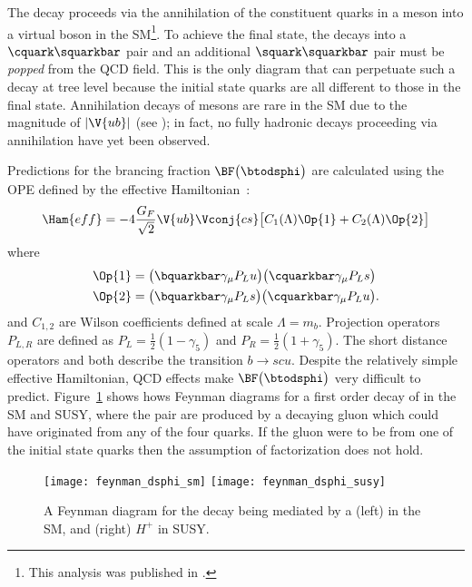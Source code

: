 The decay \btodsphi proceeds via the annihilation of the constituent quarks in a \Bp meson into
a virtual \Wp boson in the SM\footnote{
  This analysis was published in .}.
To achieve the final state, the \Wp decays into a $\cquark\squarkbar$ pair and an additional
$\squark\squarkbar$ pair must be \emph{popped} from the QCD field.
This is the only diagram that can perpetuate such a decay at tree level because the initial state
quarks are all different to those in the final state.
Annihilation decays of \Bp mesons are rare in the SM due to the magnitude of $|\V{ub}|$ (see
); in fact, no fully hadronic decays proceeding via annihilation have yet been
observed.


Predictions for the brancing fraction $\BF\big(\btodsphi\big)$ are calculated using the OPE defined
by the effective Hamiltonian~\cite{Zou:2009zza,Mohanta:2002wf,PhysRevD.76.057701,Lu:2001yz}:
\begin{equation}
  \Ham{eff}=
  -4\frac{G_F}{\sqrt{2}} \V{ub}\Vconj{cs}
  \big[
    C_1(\Lambda)\Op{1}+C_2(\Lambda)\Op{2}
    \big]
\end{equation}
where
\begin{align}
  \Op{1} &= \big(\bquarkbar\gamma_\mu P_Lu\big) \big(\cquarkbar\gamma_\mu P_Ls\big) \nonumber\\
  \Op{2} &= \big(\bquarkbar\gamma_\mu P_Ls\big) \big(\cquarkbar\gamma_\mu P_Lu\big).
\end{align}
and $C_{1,2}$ are Wilson coefficients defined at scale $\Lambda=m_b$.
Projection operators $P_{L,R}$ are defined as $P_L=\tfrac12(1-\gamma_5)$ and
$P_R=\tfrac12(1+\gamma_5)$.
The short distance operators  and  both describe the transition $b\!\to scu$.
Despite the relatively simple effective Hamiltonian, QCD effects make $\BF\big(\btodsphi\big)$ very
difficult to predict.
Figure~\ref{fig:dsphi:feyn} shows hows Feynman diagrams for a first order decay of \btodsphi in the
SM and SUSY, where the \ssbar pair are produced by a decaying gluon which could have
originated from any of the four quarks.
If the gluon were to be from one of the initial state quarks then the assumption of factorization
does not hold.


\begin{figure}
  \begin{center}
    \texttt{[image: feynman\_dsphi\_sm]}
    \texttt{[image: feynman\_dsphi\_susy]}
    \caption[Feynman diagram for the decay \btodsphi]
    {\small
      A Feynman diagram for the decay \btodsphi being mediated by a
      (left) \Wp in the SM, and
      (right) $H^+$ in SUSY.
    }
    \label{fig:dsphi:feyn}
  \end{center}
\end{figure}



